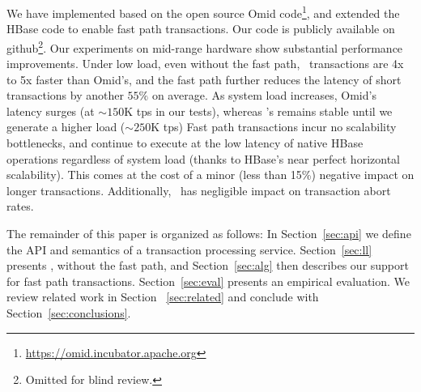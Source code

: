 We have implemented {\sys\/} %
based on the open source Omid code\footnote{\url{https://omid.incubator.apache.org}}, 
and extended the HBase code to enable fast path 
transactions. %
Our code is publicly available on github\footnote{Omitted for blind review.}. 
Our experiments on mid-range hardware show substantial performance improvements.
Under low load,
even without the fast path, \sys\ transactions are 4x to 5x faster than Omid's, 
and the fast path further reduces the latency of short transactions by another $55\%$ on average.
As system load increases, Omid's latency surges (at  $\sim\!\!\!150$K tps in our tests),  
whereas \sys's remains stable until we generate a higher load ($\sim\!\!250$K tps)
Fast path transactions incur no scalability
bottlenecks, and continue to execute at the low latency of native HBase operations regardless of system load
(thanks to HBase's near perfect horizontal scalability).
This comes at the cost of a minor (less than 15\%) negative impact on longer transactions. 
Additionally, \sys\ has negligible impact on  transaction abort rates.

The remainder of this paper is organized as follows:
In Section~\ref{sec:api} we define the  API and semantics of a transaction processing service. 
Section~\ref{sec:ll} presents \sys, without the fast path, and 
Section~\ref{sec:alg} then describes our support for fast path  transactions.  
Section~\ref{sec:eval} presents an empirical evaluation.
We review related work in Section ~\ref{sec:related} and conclude with Section~\ref{sec:conclusions}.
